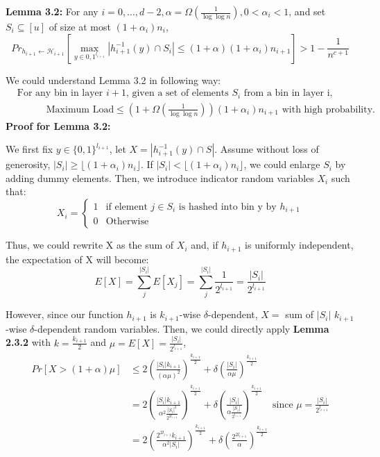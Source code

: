 \documentclass[a4paper, english]{paper}
\begin{document}
	\noindent\textbf{Lemma 3.2:} For any $i = {0,...,d-2},\alpha = \Omega(\frac1{\log\log n}), 0<\alpha_i<1$, and set $S_i\subseteq[u]$ of size at most $(1+\alpha_i)n_i$,
	$${Pr}_{h_{i+1}\leftarrow \mathscr{H}_{i+1}}\left[\max_{y\in{0,1}^{l_{i+1}}}|h_{i+1}^{-1}(y) \cap S_i|\le(1+\alpha)(1+\alpha_i)n_{i+1}\right]> 1-\frac1{n^{c+1}}$$\par
	We could understand Lemma 3.2 in following way:
	\begin{align*}
	&\text{For any bin in layer $i+1$, given a set of elements $S_i$ from a bin in layer i,}\\
	&\qquad\quad \text{Maximum Load} \le \left(1+\Omega(\frac1 {\log\log n})\right)(1+\alpha_i)n_{i+1} \text{ with high probability.}
	\end{align*}
	\noindent\textbf{Proof for Lemma 3.2:} \par
	We first fix $y\in\{0,1\}^{l_{i+1}}$, let $X=|h_{i+1}^{-1}(y)\cap S|$. Assume without loss of generosity, $|S_i|\ge \lfloor (1+\alpha_i)n_i\rfloor$. If $|S_i|< \lfloor (1+\alpha_i)n_i\rfloor$, we could enlarge $S_i$ by adding dummy elements. Then, we introduce indicator random variables $X_i$ such that:
\[ X_i=\begin{cases} 
      1 & \text{if element }j\in S_i\text{ is hashed into bin y by }h_{i+1} \\
      0 & \text{Otherwise}
   \end{cases}
\]\par
	Thus, we could rewrite X as the sum of $X_i$ and, if $h_{i+1}$ is uniformly independent, the expectation of X will become:
	$$E[X] = \sum_j^{|S_i|}E[X_j]=\sum_j^{|S_i|}\frac1{2^{l_{i+1}}} = \frac{|S_i|}{2^{l_{i+1}}}$$\par
	However, since our function $h_{i+1}$ is $k_{i+1}$-wise $\delta$-dependent, $X=$ sum of $|S_i|$ $k_{i+1}$-wise $\delta$-dependent random variables. Then, we could directly apply \textbf{Lemma 2.3.2} with $k = \frac{k_{i+1}}2$ and $\mu =E[X]=\frac{|S_i|}{2^{l_{i+1}}}$,
	\begin{align*}
	Pr[X>(1+\alpha)\mu] &\le 2\left(\frac{|S_i|k_{i+1}}{(\alpha\mu)^2}\right)^{\frac{k_{i+1}}2}+\delta\left( \frac{|S_i|}{\alpha\mu}\right)^{\frac{k_{i+1}}2}\\
	&= 2\left(\frac{|S_i|k_{i+1}}{\alpha^2 \frac{|S_i|^2}{2^{2l_{i+1}}}}\right)^{\frac{k_{i+1}}2} +\delta\left( \frac{|S_i|}{\alpha\frac{|S_i|}{2^{l_{i+1}}}}\right)^{\frac{k_{i+1}}2}\quad\text{since }\mu =\frac{|S_i|}{2^{l_{i+1}}}\\
	&= 2\left(\frac{2^{2l_{i+1}}k_{i+1}}{\alpha^2 |S_i|}\right)^{\frac{k_{i+1}}2} +\delta\left( \frac{2^{2l_{i+1}}}{\alpha}\right)^{\frac{k_{i+1}}2}
	\end{align*}\par
\end{document}
